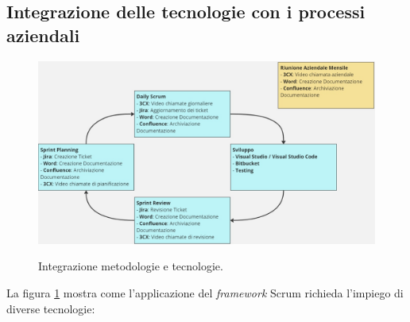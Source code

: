 \subsection{Integrazione delle tecnologie con i processi aziendali}
\begin{figure}[H]
      \centering
      \includegraphics[alt={metodologie e tecnologie}, width=\textwidth]{img/integrazione metodologie strumenti.jpg}
      \caption[Integrazione metodologie e tecnologie]
              {Integrazione metodologie e tecnologie.}
      \label{fig:integrazione tecnologie e metodologie}
  \end{figure}
La figura \ref{fig:integrazione tecnologie e metodologie} mostra come l'applicazione del \textit{framework} Scrum richieda 
l'impiego di diverse tecnologie:
